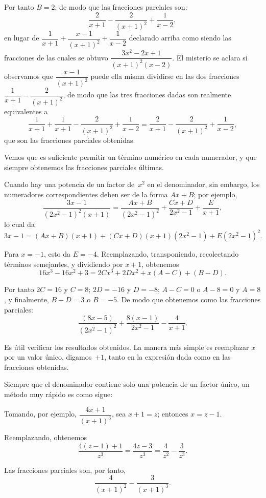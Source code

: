\documentclass[12pt]{book}[2005/09/16]
\newcommand{\DPPageSep}[2]{\Pagelabel{#2}}
\newcommand{\Pagelabel}[1]
  {\phantomsection\label{#1}}
\begin{document}
Por tanto $B=2$; de modo que las fracciones parciales son:
\[
\frac{2}{x+1} - \frac{2}{(x+1)^2} + \frac{1}{x-2},
\]
en lugar de $\dfrac{1}{x+1} + \dfrac{x-1}{(x+1)^2} + \dfrac{1}{x-2}$ declarado arriba como siendo
las fracciones de las cuales se obtuvo $\dfrac{3x^2-2x+1}{(x+1)^2(x-2)}$.
El misterio se aclara si observamos que $\dfrac{x-1}{(x+1)^2}$ puede
ella misma dividirse en las dos fracciones $\dfrac{1}{x+1} - \dfrac{2}{(x+1)^2}$, de modo
que las tres fracciones dadas son realmente equivalentes a
\[
\frac{1}{x+1} + \frac{1}{x+1} - \frac{2}{(x+1)^2} + \frac{1}{x-2}
  = \frac{2}{x+1} - \frac{2}{(x+1)^2} + \frac{1}{x-2},
\]
que son las fracciones parciales obtenidas.

Vemos que es suficiente permitir un término numérico
en cada numerador, y que siempre obtenemos las
fracciones parciales últimas.

Cuando hay una potencia de un factor de~$x^2$ en el
denominador, sin embargo, los numeradores correspondientes
deben ser de la forma $Ax+B$; por ejemplo,
\[
\frac{3x-1}{(2x^2-1)^2(x+1)}
  = \frac{Ax+B}{(2x^2-1)^2} + \frac{Cx+D}{2x^2-1} + \frac{E}{x+1},
\]
\DPPageSep{141.png}{129}%
lo cual da
\[%
3x - 1 = (Ax + B)(x + 1)
       + (Cx + D)(x + 1)(2x^2 - 1) + E(2x^2 - 1)^2.
\]

Para $x = -1$, esto da $E = -4$. Reemplazando, transponiendo,
recolectando términos semejantes, y dividiendo por $x + 1$,
obtenemos
\[
16x^3 - 16x^2 + 3 = 2Cx^3 + 2Dx^2 + x(A - C) + (B - D).
\]

Por tanto $2C = 16$ y $C = 8$; $2D = -16$ y $D = -8$;
$A - C = 0$ o $A - 8 = 0$ y $A = 8$, y finalmente, $B - D = 3$
o $B = -5$. De modo que obtenemos como las fracciones parciales:
\[
\frac{(8x - 5)}{(2x^2 - 1)^2} + \frac{8(x - 1)}{2x^2 - 1} - \frac{4}{x + 1}.
\]

Es útil verificar los resultados obtenidos. La
manera más simple es reemplazar $x$ por un valor único, digamos~$+1$,
tanto en la expresión dada como en las
fracciones obtenidas.

Siempre que el denominador contiene solo una potencia de
un factor único, un método muy rápido es como sigue:

Tomando, por ejemplo, $\dfrac{4x + 1}{(x + 1)^3}$, sea $x + 1 = z$; entonces
$x = z - 1$.

Reemplazando, obtenemos
\[
\frac{4(z - 1) + 1}{z^3} = \frac{4z - 3}{z^3} = \frac{4}{z^2} - \frac{3}{z^3}.
\]

Las fracciones parciales son, por tanto,
\[
\frac{4}{(x + 1)^2} - \frac{3}{(x + 1)^3}.
\]
\DPPageSep{142.png}{130}%
\end{document}
